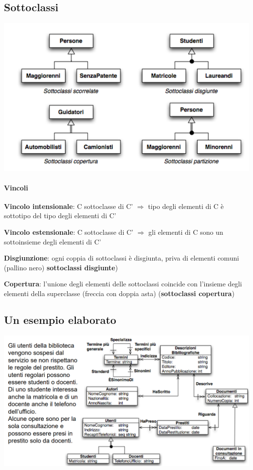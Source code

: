 \documentclass[10pt]{book}
\begin{document}
\subsection{Sottoclassi}
\begin{center}
	\includegraphics[scale=0.5]{sottoclassi.png}
\end{center}
\paragraph{Vincoli}
\begin{list}{}{}
	\item \textbf{Vincolo intensionale}: C sottoclasse di C' $\Rightarrow$ tipo degli elementi di C è sottotipo del tipo degli elementi di C'
	\item \textbf{Vincolo estensionale}: C sottoclasse di C' $\Rightarrow$ gli elementi di C sono un sottoinsieme degli elementi di C'
	\item \textbf{Disgiunzione}: ogni coppia di sottoclassi è disgiunta, priva di elementi comuni (pallino nero) \textbf{sottoclassi disgiunte})
	\item \textbf{Copertura}: l'unione degli elementi delle sottoclassi coincide con l'insieme degli elementi della superclasse (freccia con doppia asta) (\textbf{sottoclassi copertura})
\end{list}
\subsection{Un esempio elaborato}
\begin{center}
	\includegraphics[scale=0.65]{esempioelaborato.png}
\end{center}
\pagebreak
\end{document}
